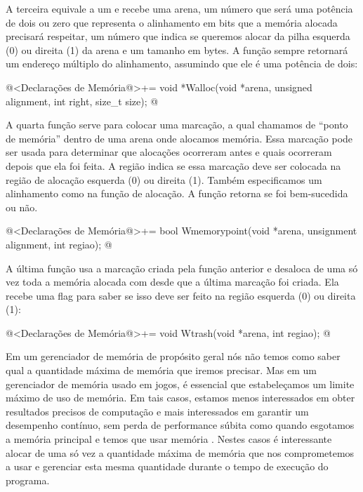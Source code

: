 A terceira equivale a um  e recebe uma arena, um
número que será uma potência de dois ou zero que representa o
alinhamento em bits que a memória alocada precisará respeitar, um
número que indica se queremos alocar da pilha esquerda (0) ou direita
(1) da arena e um tamanho em bytes. A função sempre retornará um
endereço múltiplo do alinhamento, assumindo que ele é uma potência
de dois:

\iniciocodigo
@<Declarações de Memória@>+=
void *Walloc(void *arena, unsigned alignment, int right, size_t size);
@
\fimcodigo

A quarta função serve para colocar uma marcação, a qual chamamos de
``ponto de memória'' dentro de uma arena onde alocamos memória. Essa
marcação pode ser usada para determinar que alocações ocorreram antes
e quais ocorreram depois que ela foi feita. A região indica se essa
marcação deve ser colocada na região de alocação esquerda (0) ou
direita (1). Também especificamos um alinhamento como na função de
alocação. A função retorna se foi bem-sucedida ou não.

\iniciocodigo
@<Declarações de Memória@>+=
bool Wmemorypoint(void *arena, unsignment alignment, int regiao);
@
\fimcodigo

A última função usa a marcação criada pela função anterior e desaloca
de uma só vez toda a memória alocada com  desde que
a última marcação foi criada. Ela recebe uma flag para saber se isso
deve ser feito na região esquerda (0) ou direita (1):

\iniciocodigo
@<Declarações de Memória@>+=
void Wtrash(void *arena, int regiao);
@
\fimcodigo



Em um gerenciador de memória de propósito geral nós não temos como
saber qual a quantidade máxima de memória que iremos precisar. Mas em
um gerenciador de memória usado em jogos, é essencial que
estabeleçamos um limite máximo de uso de memória. Em tais casos,
estamos menos interessados em obter resultados precisos de computação
e mais interessados em garantir um desempenho contínuo, sem perda de
performance súbita como quando esgotamos a memória principal e temos
que usar memória . Nestes casos é interessante alocar de
uma só vez a quantidade máxima de memória que nos comprometemos a usar
e gerenciar esta mesma quantidade durante o tempo de execução do
programa.

